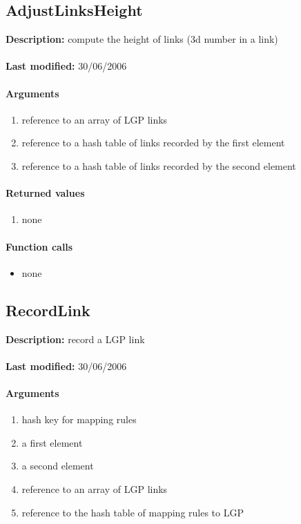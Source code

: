 \subsection{AdjustLinksHeight}
\textbf{Description:} compute the height of links (3d number in a link)\\
\\\textbf{Last modified:} 30/06/2006

\paragraph{Arguments}
\begin{enumerate}
\item reference to an array of LGP links
\item reference to a hash table of links recorded by the first element
\item reference to a hash table of links recorded by the second element
\end{enumerate}

\paragraph{Returned values}
\begin{enumerate}
\item none
\end{enumerate}

\paragraph{Function calls}
\begin{itemize}
\item none
\end{itemize}

\subsection{RecordLink}
\textbf{Description:} record a LGP link\\
\\\textbf{Last modified:} 30/06/2006

\paragraph{Arguments}
\begin{enumerate}
\item hash key for mapping rules
\item a first element
\item a second element
\item reference to an array of LGP links
\item reference to the hash table of mapping rules to LGP
\end{enumerate}

